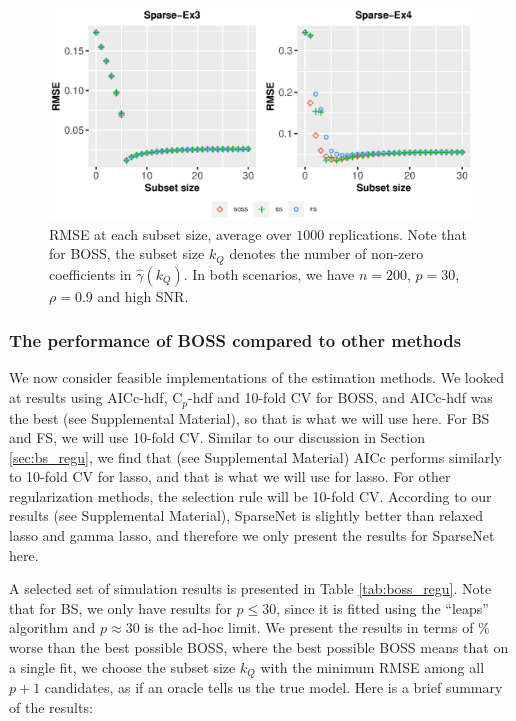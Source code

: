 \begin{figure}[ht!]
	\centering
	\includegraphics[width=\textwidth]{figures/rmse_solpath_lsmethods.eps}
	\caption{RMSE at each subset size, average over $1000$ replications. Note that for BOSS, the subset size $k_Q$ denotes the number of non-zero coefficients in $\hat{\gamma}(k_Q)$. In both scenarios, we have $n=200$, $p=30$, $\rho=0.9$ and high SNR.}
	\label{fig:lossratio_fs_boss_k}
\end{figure}


\subsubsection{The performance of BOSS compared to other methods}
\label{sec:boss_regu}
We now consider feasible implementations of the estimation methods. We looked at results using AICc-hdf, C$_p$-hdf and 10-fold CV for BOSS, and AICc-hdf was the best (see Supplemental Material), so that is what we will use here. For BS and FS, we will use 10-fold CV. Similar to our discussion in Section \ref{sec:bs_regu}, we find that (see Supplemental Material) AICc performs similarly to 10-fold CV for lasso, and that is what we will use for lasso. For other regularization methods, the selection rule will be 10-fold CV. According to our results (see Supplemental Material), SparseNet is slightly better than relaxed lasso and gamma lasso, and therefore we only present the results for SparseNet here. 

A selected set of simulation results is presented in Table \ref{tab:boss_regu}. Note that for BS, we only have results for $p\le 30$, since it is fitted using the ``leaps'' algorithm and $p \approx 30$ is the ad-hoc limit. We present the results in terms of $\%$ worse than the best possible BOSS, where the best possible BOSS means that on a single fit, we choose the subset size $k_Q$ with the minimum RMSE among all $p+1$ candidates, as if an oracle tells us the true model. Here is a brief summary of the results:


